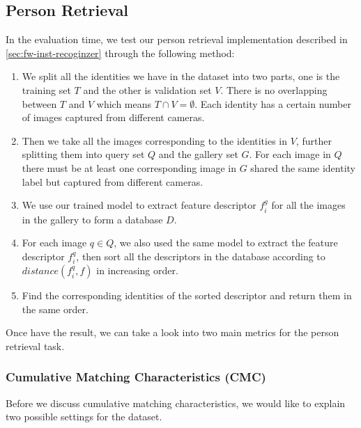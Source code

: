 \subsection{Person Retrieval}
\label{sec:Eval-reid}

In the evaluation time, we test our person retrieval implementation described
in \autoref{sec:fw-inst-recoginzer} through the following method:

\begin{enumerate}
    \item We split all the identities we have in the dataset into two parts,
    one is the training set $T$ and the other is validation set $V$. There is no
    overlapping between $T$ and $V$ which means $T \cap V = \emptyset$. Each
    identity has a certain number of images captured from different cameras.

    \item Then we take all the images corresponding to the identities in $V$,
    further splitting them into query set $Q$ and the gallery set $G$. For each
    image in $Q$ there must be at least one corresponding image in $G$ shared
    the same identity label but captured from different cameras.

    \item We use our trained model to extract feature descriptor $f_i^g$ for
    all the images in the gallery to form a database $D$.

    \item For each image $q \in Q$, we also used the same model to extract the
    feature descriptor $f_i^q$, then sort all the descriptors in the database
    according to $\mathit{distance}(f_i^q, f)$ in increasing order.

    \item Find the corresponding identities of the sorted descriptor and return
    them in the same order.
\end{enumerate}

Once have the result, we can take a look into two main metrics for the 
person retrieval task.

\subsubsection{Cumulative Matching Characteristics (CMC)}
\label{sec:Eval-reid-cmc}

Before we discuss cumulative matching characteristics, we would like to explain
two possible settings for the dataset.

